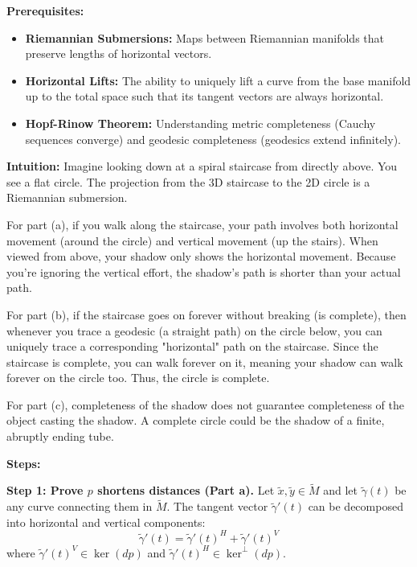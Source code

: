 \begin{solution}
\textbf{Prerequisites:} 
\begin{itemize}
    \item \textbf{Riemannian Submersions:} Maps between Riemannian manifolds that preserve lengths of horizontal vectors.
    \item \textbf{Horizontal Lifts:} The ability to uniquely lift a curve from the base manifold up to the total space such that its tangent vectors are always horizontal.
    \item \textbf{Hopf-Rinow Theorem:} Understanding metric completeness (Cauchy sequences converge) and geodesic completeness (geodesics extend infinitely).
\end{itemize}

\textbf{Intuition:} 
Imagine looking down at a spiral staircase from directly above. You see a flat circle. The projection from the 3D staircase to the 2D circle is a Riemannian submersion. 

For part (a), if you walk along the staircase, your path involves both horizontal movement (around the circle) and vertical movement (up the stairs). When viewed from above, your shadow only shows the horizontal movement. Because you're ignoring the vertical effort, the shadow's path is shorter than your actual path.

For part (b), if the staircase goes on forever without breaking (is complete), then whenever you trace a geodesic (a straight path) on the circle below, you can uniquely trace a corresponding "horizontal" path on the staircase. Since the staircase is complete, you can walk forever on it, meaning your shadow can walk forever on the circle too. Thus, the circle is complete.

For part (c), completeness of the shadow does not guarantee completeness of the object casting the shadow. A complete circle could be the shadow of a finite, abruptly ending tube.

\textbf{Steps:}

\textbf{Step 1: Prove $p$ shortens distances (Part a).}
Let $\tilde{x}, \tilde{y} \in \tilde{M}$ and let $\tilde{\gamma}(t)$ be any curve connecting them in $\tilde{M}$.
The tangent vector $\tilde{\gamma}'(t)$ can be decomposed into horizontal and vertical components:
\[ \tilde{\gamma}'(t) = \tilde{\gamma}'(t)^H + \tilde{\gamma}'(t)^V \]
where $\tilde{\gamma}'(t)^V \in \ker(dp)$ and $\tilde{\gamma}'(t)^H \in \ker^{\perp}(dp)$.


\end{solution}
